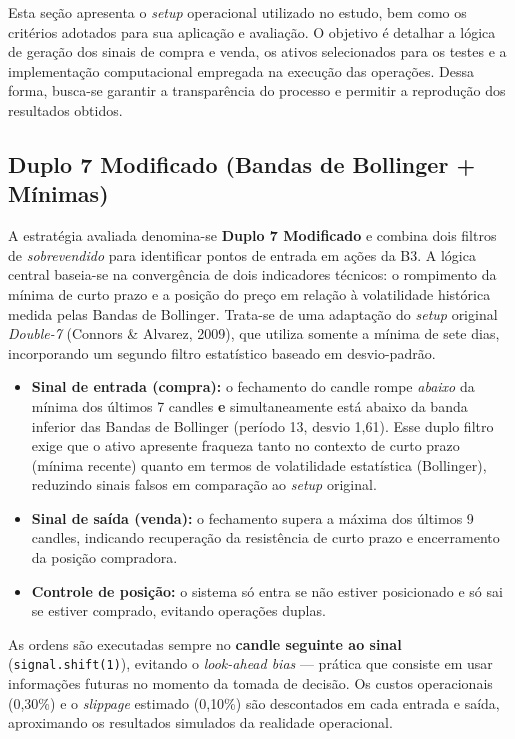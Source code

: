\documentclass[a4paper,10pt]{article}
\begin{document}
Esta seção apresenta o \textit{setup} operacional utilizado no estudo, bem como os critérios adotados para sua aplicação e avaliação. O objetivo é detalhar a lógica de geração dos sinais de compra e venda, os ativos selecionados para os testes e a implementação computacional empregada na execução das operações. Dessa forma, busca-se garantir a transparência do processo e permitir a reprodução dos resultados obtidos.

\subsection{Duplo 7 Modificado (Bandas de Bollinger + Mínimas)}

A estratégia avaliada denomina-se \textbf{Duplo 7 Modificado} e combina dois filtros de \textit{sobrevendido} para identificar pontos de entrada em ações da B3. A lógica central baseia-se na convergência de dois indicadores técnicos: o rompimento da mínima de curto prazo e a posição do preço em relação à volatilidade histórica medida pelas Bandas de Bollinger. Trata-se de uma adaptação do \textit{setup} original \textit{Double-7} (Connors \& Alvarez, 2009), que utiliza somente a mínima de sete dias, incorporando um segundo filtro estatístico baseado em desvio-padrão.

\begin{itemize}
  \item \textbf{Sinal de entrada (compra):} o fechamento do candle rompe \textit{abaixo} da mínima dos últimos 7 candles \textbf{e} simultaneamente está abaixo da banda inferior das Bandas de Bollinger (período 13, desvio 1{,}61). Esse duplo filtro exige que o ativo apresente fraqueza tanto no contexto de curto prazo (mínima recente) quanto em termos de volatilidade estatística (Bollinger), reduzindo sinais falsos em comparação ao \textit{setup} original.
  \item \textbf{Sinal de saída (venda):} o fechamento supera a máxima dos últimos 9 candles, indicando recuperação da resistência de curto prazo e encerramento da posição compradora.
  \item \textbf{Controle de posição:} o sistema só entra se não estiver posicionado e só sai se estiver comprado, evitando operações duplas.
\end{itemize}

\noindent As ordens são executadas sempre no \textbf{candle seguinte ao sinal} (\texttt{signal.shift(1)}), evitando o \textit{look-ahead bias} --- prática que consiste em usar informações futuras no momento da tomada de decisão. Os custos operacionais (0{,}30\%) e o \textit{slippage} estimado (0{,}10\%) são descontados em cada entrada e saída, aproximando os resultados simulados da realidade operacional.
\end{document}
